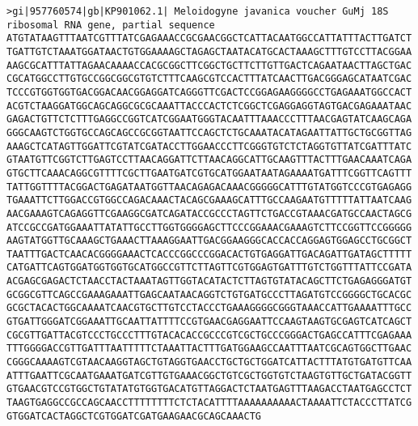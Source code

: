 \documentclass[11pt]{article}
\begin{document}
\begin{Verbatim}[commandchars=\\\{\}]
>gi|957760574|gb|KP901062.1| Meloidogyne javanica voucher GuMj 18S ribosomal RNA gene, partial sequence
ATGTATAAGTTTAATCGTTTATCGAGAAACCGCGAACGGCTCATTACAATGGCCATTATTTACTTGATCT
TGATTGTCTAAATGGATAACTGTGGAAAAGCTAGAGCTAATACATGCACTAAAGCTTTGTCCTTACGGAA
AAGCGCATTTATTAGAACAAAACCACGCGGCTTCGGCTGCTTCTTGTTGACTCAGAATAACTTAGCTGAC
CGCATGGCCTTGTGCCGGCGGCGTGTCTTTCAAGCGTCCACTTTATCAACTTGACGGGAGCATAATCGAC
TCCCGTGGTGGTGACGGACAACGGAGGATCAGGGTTCGACTCCGGAGAAGGGGCCTGAGAAATGGCCACT
ACGTCTAAGGATGGCAGCAGGCGCGCAAATTACCCACTCTCGGCTCGAGGAGGTAGTGACGAGAAATAAC
GAGACTGTTCTCTTTGAGGCCGGTCATCGGAATGGGTACAATTTAAACCCTTTAACGAGTATCAAGCAGA
GGGCAAGTCTGGTGCCAGCAGCCGCGGTAATTCCAGCTCTGCAAATACATAGAATTATTGCTGCGGTTAG
AAAGCTCATAGTTGGATTCGTATCGATACCTTGGAACCCTTCGGGTGTCTCTAGGTGTTATCGATTTATC
GTAATGTTCGGTCTTGAGTCCTTAACAGGATTCTTAACAGGCATTGCAAGTTTACTTTGAACAAATCAGA
GTGCTTCAAACAGGCGTTTTCGCTTGAATGATCGTGCATGGAATAATAGAAAATGATTTCGGTTCAGTTT
TATTGGTTTTACGGACTGAGATAATGGTTAACAGAGACAAACGGGGGCATTTGTATGGTCCCGTGAGAGG
TGAAATTCTTGGACCGTGGCCAGACAAACTACAGCGAAAGCATTTGCCAAGAATGTTTTTATTAATCAAG
AACGAAAGTCAGAGGTTCGAAGGCGATCAGATACCGCCCTAGTTCTGACCGTAAACGATGCCAACTAGCG
ATCCGCCGATGGAAATTATATTGCCTTGGTGGGGAGCTTCCCGGAAACGAAAGTCTTCCGGTTCCGGGGG
AAGTATGGTTGCAAAGCTGAAACTTAAAGGAATTGACGGAAGGGCACCACCAGGAGTGGAGCCTGCGGCT
TAATTTGACTCAACACGGGGAAACTCACCCGGCCCGGACACTGTGAGGATTGACAGATTGATAGCTTTTT
CATGATTCAGTGGATGGTGGTGCATGGCCGTTCTTAGTTCGTGGAGTGATTTGTCTGGTTTATTCCGATA
ACGAGCGAGACTCTAACCTACTAAATAGTTGGTACATACTCTTAGTGTATACAGCTTCTGAGAGGGATGT
GCGGCGTTCAGCCGAAAGAAATTGAGCAATAACAGGTCTGTGATGCCCTTAGATGTCCGGGGCTGCACGC
GCGCTACACTGGCAAAATCAACGTGCTTGTCCTACCCTGAAAGGGGCGGGTAAACCATTGAAAATTTGCC
GTGATTGGGATCGGAAATTGCAATTATTTTCCGTGAACGAGGAATTCCAAGTAAGTGCGAGTCATCAGCT
CGCGTTGATTACGTCCCTGCCCTTTGTACACACCGCCCGTCGCTGCCCGGGACTGAGCCATTTCGAGAAA
TTTGGGGACCGTTGATTTAATTTTTCTAAATTACTTTGATGGAAGCCAATTTAATCGCAGTGGCTTGAAC
CGGGCAAAAGTCGTAACAAGGTAGCTGTAGGTGAACCTGCTGCTGGATCATTACTTTATGTGATGTTCAA
ATTTGAATTCGCAATGAAATGATCGTTGTGAAACGGCTGTCGCTGGTGTCTAAGTGTTGCTGATACGGTT
GTGAACGTCCGTGGCTGTATATGTGGTGACATGTTAGGACTCTAATGAGTTTAAGACCTAATGAGCCTCT
TAAGTGAGGCCGCCAGCAACCTTTTTTTTCTCTACATTTTAAAAAAAAAACTAAAATTCTACCCTTATCG
GTGGATCACTAGGCTCGTGGATCGATGAAGAACGCAGCAAACTG


\end{Verbatim}
\end{document}
